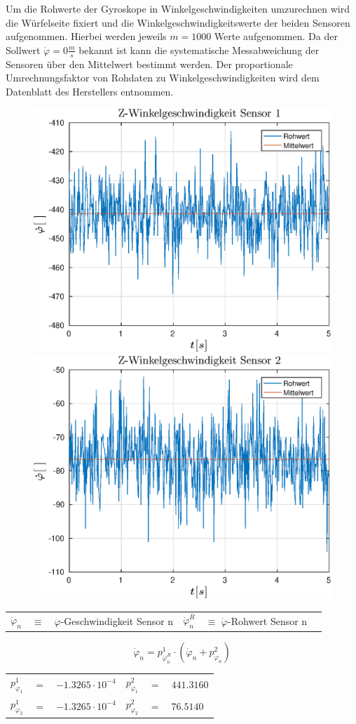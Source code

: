 Um die Rohwerte der Gyroskope in Winkelgeschwindigkeiten umzurechnen wird die Würfelseite fixiert und die Winkelgeschwindigkeitswerte der beiden Sensoren aufgenommen. Hierbei werden jeweils $m = 1000$ Werte aufgenommen. Da der Sollwert $\dot{\varphi} = 0 \frac{m}{s}$ bekannt ist kann die systematische Messabweichung der Sensoren über den Mittelwert bestimmt werden. Der proportionale Umrechnungsfaktor von Rohdaten zu Winkelgeschwindigkeiten wird dem Datenblatt des Herstellers entnommen.
\begin{figure}[h]
	\includegraphics[width=0.5\linewidth]{img/phi1__d.eps}
	\includegraphics[width=0.5\linewidth]{img/phi2__d.eps}
\end{figure}
\vspace*{-\baselineskip}
\begin{table}[h]
\centering
\begin{tabular}{lcllcl}
$\dot{\varphi}_n$ & $\equiv$ & $\varphi$-Geschwindigkeit Sensor n & $\dot{\varphi}^R_n$ & $\equiv$ $\dot{\varphi}$-Rohwert Sensor n
\end{tabular}
\end{table}
\vspace*{-\baselineskip}
\begin{equation}
\dot{\varphi}_n = p^1_{\dot{\varphi}^R_n}  \cdot (\dot{\varphi}_n + p^2_{\dot{\varphi}_n})
\end{equation}
\vspace*{-\baselineskip}
\begin{table}[h]
\centering
\begin{tabular}{lcllcl}
$p^1_{\varphi_1}$ &$=$& $-1.3265 \cdot 10^{-4}$ & $p^2_{\varphi_1}$ &$=$& $441.3160$ \\
$p^1_{\varphi_2}$ &$=$& $-1.3265 \cdot 10^{-4}$ & $p^2_{\varphi_2}$ &$=$& $76.5140$ \\
\end{tabular}
\end{table}
\vspace*{-\baselineskip}
